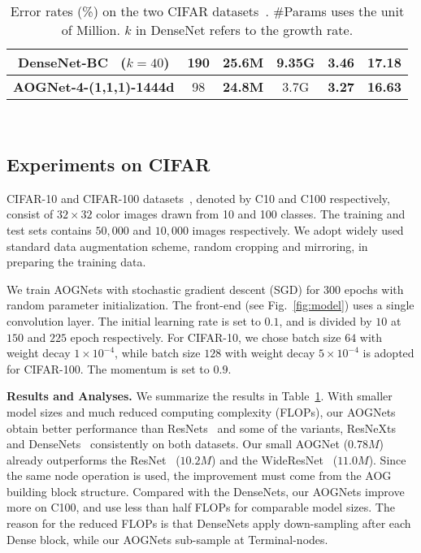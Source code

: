 \documentclass[10pt,twocolumn,letterpaper]{article}
\begin{document}
\begin{table}[t]
{{\begin{tabular}{c|ccc|cc}
		DenseNet-BC~\cite{DenseNet} ($k = 40$) & 190 & 25.6M & 9.35G & 3.46 & 17.18 \\ \hline
		\textbf{AOGNet-4-(1,1,1)-1444d} & 98 & \textbf{24.8M} & 3.7G & \textbf{3.27} & \textbf{16.63} \\ \hline 
        \end{tabular} 
        } 
        }
        \\ [1ex]
        \caption{Error rates (\%) on the two CIFAR datasets~\cite{CIFAR}. \#Params uses the unit of Million. $k$ in DenseNet refers to the growth rate. %
        }\label{table:cifar-results} 
    \end{table}
    
   
 






    
\subsection{Experiments on CIFAR}
CIFAR-10 and CIFAR-100 datasets~\cite{CIFAR}, denoted by C10 and C100 respectively,  consist of $32\times32$ color images drawn from 10 and 100 classes. The training and test sets contains $50,000$ and $10,000$ images respectively. We adopt widely used standard data augmentation scheme, random cropping and mirroring, in preparing the training data. %

We train AOGNets with stochastic gradient descent (SGD) for $300$ epochs with random parameter initialization. The front-end (see Fig.~\ref{fig:model}) uses a single convolution layer. The initial learning rate is set to $0.1$, and is divided by $10$ at $150$ and $225$ epoch respectively. For CIFAR-10, we chose batch size $64$ with weight decay $1\times10^{-4}$, while batch size $128$ with weight decay $5\times10^{-4}$ is adopted for CIFAR-100. The momentum is set to $0.9$.  

   
\textbf{Results and Analyses.} We summarize the results in Table~\ref{table:cifar-results}. With smaller model sizes and much reduced computing complexity (FLOPs), our AOGNets obtain better performance than ResNets~\cite{ResidualNet} and some of the variants, ResNeXts~\cite{ResNeXt} and DenseNets~\cite{DenseNet} consistently on both datasets. Our small AOGNet ($0.78M$) already outperforms the ResNet~\cite{ResidualNet} ($10.2M$) and the WideResNet~\cite{WideResNet} ($11.0M$). Since the same node operation is used, the improvement must come from the AOG building block structure. Compared with the DenseNets, our AOGNets improve more on C100, and use less than half FLOPs for comparable model sizes. The reason for the reduced FLOPs is that DenseNets apply down-sampling after each Dense block, while our AOGNets sub-sample at Terminal-nodes.  
\end{document}
